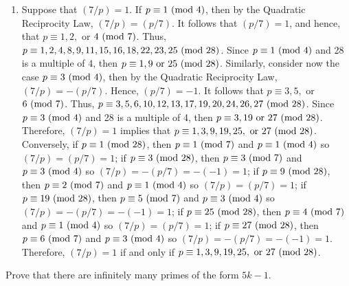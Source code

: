 \begin{solution}
\begin{enumerate}
        Conversely, if $p \equiv 1 \Mod{24}$, then $p \equiv 1 \Mod{8}$ and $p \equiv 1 \Mod{12}$, so $(6/p) = (2/p)(3/p) = 1\cdot 1 = 1$; if $p \equiv 5 \Mod{24}$, then $p \equiv 5 \Mod{8}$ and $p \equiv 5 \Mod{12}$, so $(6/p) = (2/p)(3/p) = (-1)(-1) = 1$; if $p \equiv 19 \Mod{24}$, then $p \equiv 3 \Mod{8}$ and $p \equiv 7 \Mod{12}$, so $(6/p) = (2/p)(3/p) = (-1)(-1) = 1$; if $p \equiv 23 \Mod{24}$, then $p \equiv 7 \Mod{8}$ and $p \equiv 11 \Mod{12}$, so $(6/p) = (2/p)(3/p) = 1\cdot 1 = 1$. Therefore, $(6/p) = 1$ if and only if $p \equiv 1,5,19, \text{ or } 23 \Mod{24}$.
        \item Suppose that $(7/p) = 1$. If $p \equiv 1 \ (\mathrm{mod}\ 4)$, then by the Quadratic Reciprocity Law, $(7/p) = (p/7)$. It follows that $(p/7) = 1$, and hence, that $p \equiv 1, 2,$ or $4 \ (\mathrm{mod}\ 7)$. Thus, $p \equiv 1,2,4,8,9,11,15,16,18,22,23,25 \ (\mathrm{mod}\ 28)$. Since $p \equiv 1 \ (\mathrm{mod}\ 4)$ and 28 is a multiple of 4, then $p \equiv 1, 9 \text{ or } 25 \ (\mathrm{mod}\ 28)$. Similarly, consider now the case $p \equiv 3 \ (\mathrm{mod}\ 4)$, then by the Quadratic Reciprocity Law, $(7/p) = -(p/7)$. Hence, $(p/7) = -1$. It follows that $p \equiv 3, 5,$ or $6 \ (\mathrm{mod}\ 7)$. Thus, $p \equiv 3,5,6,10,12,13,17,19,20,24,26,27 \ (\mathrm{mod}\ 28)$. Since $p \equiv 3 \ (\mathrm{mod}\ 4)$ and 28 is a multiple of 4, then $p \equiv 3, 19 \text{ or } 27 \ (\mathrm{mod}\ 28)$. Therefore, $(7/p) = 1$ implies that $p \equiv 1,3,9,19, 25, \text{ or } 27 \ (\mathrm{mod}\ 28)$.\\
        
        Conversely, if $p \equiv 1 \ (\mathrm{mod}\ 28)$, then $p \equiv 1 \ (\mathrm{mod}\ 7)$ and $p \equiv 1 \ (\mathrm{mod}\ 4)$ so $(7/p) = (p/7) = 1$; if $p \equiv 3 \ (\mathrm{mod}\ 28)$, then $p \equiv 3 \ (\mathrm{mod}\ 7)$ and $p \equiv 3 \ (\mathrm{mod}\ 4)$ so $(7/p) = -(p/7) = -(-1) = 1$;  if $p \equiv 9 \ (\mathrm{mod}\ 28)$, then $p \equiv 2 \ (\mathrm{mod}\ 7)$ and $p \equiv 1 \ (\mathrm{mod}\ 4)$ so $(7/p) = (p/7) = 1$; if $p \equiv 19 \ (\mathrm{mod}\ 28)$, then $p \equiv 5 \ (\mathrm{mod}\ 7)$ and $p \equiv 3 \ (\mathrm{mod}\ 4)$ so $(7/p) = -(p/7) = -(-1) = 1$; if $p \equiv 25 \ (\mathrm{mod}\ 28)$, then $p \equiv 4 \ (\mathrm{mod}\ 7)$ and $p \equiv 1 \ (\mathrm{mod}\ 4)$ so $(7/p) = (p/7) = 1$; if $p \equiv 27 \ (\mathrm{mod}\ 28)$, then $p \equiv 6 \ (\mathrm{mod}\ 7)$ and $p \equiv 3 \ (\mathrm{mod}\ 4)$ so $(7/p) = -(p/7) = -(-1) = 1$. Therefore, $(7/p) = 1$ if and only if $p \equiv 1,3,9,19,25, \text{ or } 27 \ (\mathrm{mod}\ 28)$. \\
    \end{enumerate}
\end{solution}

\begin{exercise}
    Prove that there are infinitely many primes of the form $5k - 1$.  \\
\end{exercise}

